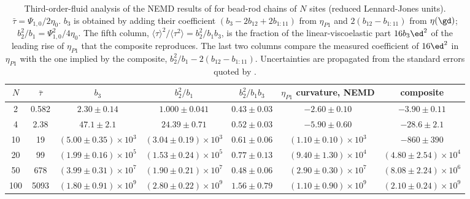 \begin{table}
\caption{Third-order-fluid analysis of the NEMD results of \cite{Daivis2007} for bead-rod chains of $N$ sites (reduced Lennard-Jones units). $\bar\tau=\Psi_{1,0}/2\eta_0$. $b_3$ is obtained by adding their coefficient $(b_3-2b_{12}+2b_{1:11})$ from $\eta_{P1}$ and $2(b_{12}-b_{1:11})$ from $\eta(\gd)$; $b_2^2/b_1=\Psi_{1,0}^2/4\eta_0$. The fifth column, $\langle\tau\rangle^2/\langle\tau^2\rangle=b_2^2/b_1b_3$, is the fraction of the linear-viscoelastic part $16b_3\ed^2$ of the leading rise of $\eta_{P1}$ that the composite reproduces. The last two columns compare the measured coefficient of $16\ed^2$ in $\eta_{P1}$ with the one implied by the composite, $b_2^2/b_1-2(b_{12}-b_{1:11})$. Uncertainties are propagated from the standard errors quoted by \cite{Daivis2007}.}
\footnotesize
\begin{ruledtabular}
\begin{tabular}{ccccccc}
$N$ & $\bar\tau$ & $b_3$ & $b_2^2/b_1$ & $b_2^2/b_1b_3$ & $\eta_{P1}$ curvature, NEMD & composite\\
\hline
2 & 0.582 & $2.30\pm0.14$ & $1.000\pm0.041$ & $0.43\pm0.03$ & $-2.60\pm0.10$ & $-3.90\pm0.11$\\
4 & 2.38 & $47.1\pm2.1$ & $24.39\pm0.71$ & $0.52\pm0.03$ & $-5.90\pm0.60$ & $-28.6\pm2.1$\\
10 & 19 & $(5.00\pm0.35)\times10^{3}$ & $(3.04\pm0.19)\times10^{3}$ & $0.61\pm0.06$ & $(1.10\pm0.10)\times10^{3}$ & $-860\pm390$\\
20 & 99 & $(1.99\pm0.16)\times10^{5}$ & $(1.53\pm0.24)\times10^{5}$ & $0.77\pm0.13$ & $(9.40\pm1.30)\times10^{4}$ & $(4.80\pm2.54)\times10^{4}$\\
50 & 678 & $(3.99\pm0.31)\times10^{7}$ & $(1.90\pm0.21)\times10^{7}$ & $0.48\pm0.06$ & $(2.90\pm0.30)\times10^{7}$ & $(8.08\pm2.24)\times10^{6}$\\
100 & 5093 & $(1.80\pm0.91)\times10^{9}$ & $(2.80\pm0.22)\times10^{9}$ & $1.56\pm0.79$ & $(1.10\pm0.90)\times10^{9}$ & $(2.10\pm0.24)\times10^{9}$\\
\end{tabular}
\end{ruledtabular}
\end{table}
